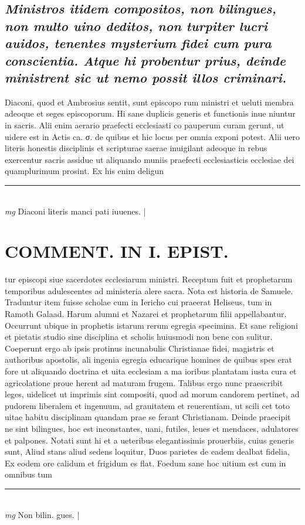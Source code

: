 \documentclass{article}
\begin{document}
\begin{pages}
\subsection*{\textit{Ministros itidem compositos, non bilingues, non multo uino deditos, non turpiter lucri auidos, tenentes mysterium fidei cum pura conscientia. Atque hi probentur prius, deinde ministrent sic ut nemo possit illos criminari. }}\pstart Diaconi, quod et Ambrosius sentit, sunt episcopo rum ministri et ueluti membra adeoque et seges episcoporum. Hi sane duplicis generis et functionis inue niuntur in sacris. Alii enim aerario praefecti ecclesiasti co pauperum curam gerunt, ut uidere est in Actis ca. σ. de quibus et hic locus per omnia exponi potest. Alii uero literis honestis disciplinis et scripturae saerae inuigilant adeoque in rebus exercentur sacris assidue ut aliquando muniis praefecti ecclesiasticis ecclesiae dei quamplurimum prosint. Ex his enim deligun\pend
\vspace{0.5cm}\noindent
\vspace{0.2cm}\rule{1cm}{0.2pt}\\ 
\hspace{0.2cm}\textit{mg}
\footnotesize Diaconi literis manci pati iuuenes. 
\normalsize| 
\section*{COMMENT. IN I. EPIST. }\pstart tur episcopi siue sacerdotes ecclesiarum ministri. Receptum fuit et prophetarum temporibus adulescentes ad ministeria alere sacra. Nota est historia de Samuele. Traduntur item fuisse scholae cum in Iericho cui praeerat Heliseus, tum in Ramoth Galaad. Harum alumni et Nazarei et prophetarum filii appellabantur. Occurrunt ubique in prophetis istarum rerum egregia specimina. Et sane religioni et pietatis studio sine disciplina et scholis huiusmodi non bene con sulitur. Coeperunt ergo ab ipsis protinus incunabulis Christianae fidei, magistris et authoribus apostolis, ali ingenia egregia educarique homines de quibus spes erat fore ut aliquando doctrina et uita ecclesiam a ma ioribus plantatam iusta cura et agricolatione proue herent ad maturam frugem. Talibus ergo nunc praescribit leges, uidelicet ut imprimis sint compositi, quod ad morum candorem pertinet, ad pudorem liberalem et ingenuum, ad grauitatem et reuerentiam, ut scili cet toto uitae habitu disciplinam quandam prae se ferant Christianam. Deinde praecipit ne sint bilingues, hoc est inconstantes, uani, futiles, leues et mendaces, adulatores et palpones. Notati sunt hi et a ueteribus elegantissimis prouerbiis, cuius generis sunt, Aliud stans aliud sedens loquitur, Duos parietes de eadem dealbat fidelia, Ex eodem ore calidum et frigidum es flat. Foedum sane hoc uitium est cum in omnibus tum  \pend
\vspace{0.5cm}\noindent
\vspace{0.2cm}\rule{1cm}{0.2pt}\\ 
\hspace{0.2cm}\textit{mg}
\footnotesize Non bilin. gues. 
\normalsize| 

\end{pages}
\end{document}
